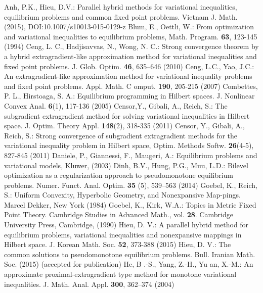 \documentclass{aims}
\theoremstyle{definition}
\begin{document}
\begin{thebibliography}{99}
 Anh, P.K., Hieu, D.V.: Parallel hybrid methods for variational inequalities, equilibrium problems and common fixed point 
problems. Vietnam J. Math. (2015), DOI:10.1007/s10013-015-0129-z
 Blum, E., Oettli, W.: From optimization and variational inequalities to equilibrium problems, Math. Program. \textbf{63}, 123-145 (1994)
 Ceng, L. C., Hadjisavvas,  N., Wong, 
N. C.: Strong convergence theorem by a hybrid
extragradient-like approximation method for variational
inequalities and fixed point problems. J. Glob. Optim. \textbf{46}, 635--646 (2010)
 Ceng, L.C., Yao, J.C.: An extragradient-like approximation method for variational inequality problems
and fixed point problems. Appl. Math. C omput. \textbf{190}, 205-215 (2007)
 Combettes, P. L., Hirstoaga, S. A.: Equilibrium programming in Hilbert spaces. J. Nonlinear Convex Anal. 
\textbf{6}(1), 117-136 (2005)
 Censor,Y., Gibali, A., Reich, S.: The subgradient extragradient method for solving variational inequalities in Hilbert space. 
J. Optim. Theory Appl. \textbf{148}(2), 318-335 (2011)
Censor, Y., Gibali, A., Reich, S.: Strong convergence of subgradient extragradient methods for the variational inequality 
problem in Hilbert space, Optim. Methods Softw. \textbf{26}(4-5), 827-845 (2011)
 Daniele, P., Giannessi, F., Maugeri, A.: Equilibrium problems and variational models, Kluwer, (2003)
 Dinh, B.V., Hung, P.G., Muu, L.D.: Bilevel optimization as a regularization approach to pseudomonotone equilibrium problems. 
Numer. Funct. Anal.  Optim. \textbf{35} (5), 539--563 (2014)
 Goebel, K., Reich, S.: Uniform Convexity, Hyperbolic Geometry, and Nonexpansive Map-pings. Marcel Dekker, New York (1984)
 Goebel, K., Kirk, W.A.: Topics in Metric Fixed Point Theory. Cambridge Studies in Advanced Math., vol. \textbf{28}. 
Cambridge University Press, Cambridge, (1990)
 Hieu, D. V.: A parallel hybrid method for equilibrium problems, variational inequalities and nonexpansive mappings in Hilbert space. 
J. Korean Math. Soc. \textbf{52}, 373-388 (2015)
 Hieu, D. V.: The common solutions to pseudomonotone equilibrium problems. Bull. Iranian Math. Soc. (2015) 
(accepted for publication)
He, B .-S., Yang, Z.-H., Yu an, X.-M.: An approximate proximal-extragradient type method for monotone
variational inequalities. J. Math. Anal. Appl. \textbf{300}, 362--374 (2004)

\end{thebibliography}
\end{document}
